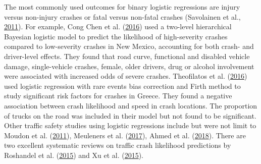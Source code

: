 \documentclass[12pt]{book}
\numberwithin{equation}{chapter}
\begin{document}
The most commonly used outcomes for binary logistic regressions are injury versus non-injury crashes or fatal versus non-fatal crashes (Savolainen et al., \protect\hyperlink{ref-savolainen2011statistical}{2011}). For example, Cong Chen et al. (\protect\hyperlink{ref-chen2016driver}{2016}) used a two-level hierarchical Bayesian logistic model to predict the likelihood of high-severity crashes compared to low-severity crashes in New Mexico, accounting for both crash- and driver-level effects. They found that road curve, functional and disabled vehicle damage, single-vehicle crashes, female, older drivers, drug or alcohol involvement were associated with increased odds of severe crashes. Theofilatos et al. (\protect\hyperlink{ref-theofilatos2016predicting}{2016}) used logistic regression with rare events bias correction and Firth method to study significant risk factors for crashes in Greece. They found a negative association between crash likelihood and speed in crash locations. The proportion of trucks on the road was included in their model but not found to be significant. Other traffic safety studies using logistic regressions include but were not limit to Moudon et al. (\protect\hyperlink{ref-moudon2011risk}{2011}), Meuleners et al. (\protect\hyperlink{ref-meuleners2017determinants}{2017}), Ahmed et al. (\protect\hyperlink{ref-ahmed2018effects}{2018}). There are two excellent systematic reviews on traffic crash likelihood predictions by Roshandel et al. (\protect\hyperlink{ref-roshandel2015impact}{2015}) and Xu et al. (\protect\hyperlink{ref-xu2015calibration}{2015}).
\end{document}
